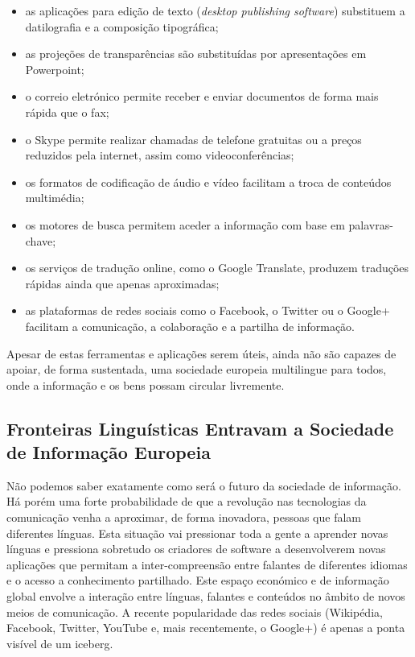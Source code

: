 \begin{multicols}{2}
\begin{itemize}
      \item as aplicações para edição de texto (\textit{desktop publishing software}) substituem a datilografia e a composição tipográfica;
      \item as projeções de transparências são substituídas por apresentações em Powerpoint;
      \item o correio eletrónico permite receber e enviar do\-cu\-men\-tos de forma mais rápida que o fax;
      \item o Skype permite realizar chamadas de telefone gra\-tui\-tas ou a preços reduzidos pela internet, assim como videoconferências;
      \item os formatos de codificação de áudio e vídeo facilitam a troca de conteúdos multimédia;
      \item os motores de busca  permitem aceder a informação com base em palavras-chave;
      \item os serviços de tradução online, como o Google Translate, produzem traduções rápidas ainda que apenas aproximadas;
      \item as plataformas de redes sociais como o Facebook, o Twitter ou o Google+  facilitam a comunicação, a colaboração e a partilha de informação.
\end{itemize}

 Apesar de estas ferramentas e aplicações serem úteis, ainda não são capazes de apoiar, de forma sustentada, uma sociedade europeia multilingue 
para todos, onde a informação e os bens possam circular livremente.

\subsection{Fronteiras Linguísticas Entravam a Sociedade de In\-for\-ma\-ção Eu\-ro\-peia}
  
Não podemos saber exatamente como será o futuro da sociedade de informação. Há porém uma forte probabilidade de que a revolução nas tecnologias da comunicação venha a aproximar, de forma inovadora, pessoas que falam diferentes línguas. 
Esta situação vai pressionar toda a gente a aprender novas línguas e pressiona sobretudo os criadores de software 
a desenvolverem novas aplicações que permitam a inter-compreensão entre falantes de diferentes idiomas e o acesso a co\-nhe\-ci\-men\-to par\-ti\-lha\-do. 
Este espaço económico e de informação global envolve a interação entre línguas, falantes e conteúdos no âmbito de novos meios de comunicação. A recente po\-pu\-la\-ri\-da\-de das redes sociais (Wikipédia, Facebook, Twitter, YouTube e, mais recentemente, o Google+) é apenas a ponta visível de um iceberg. 


\end{multicols}
